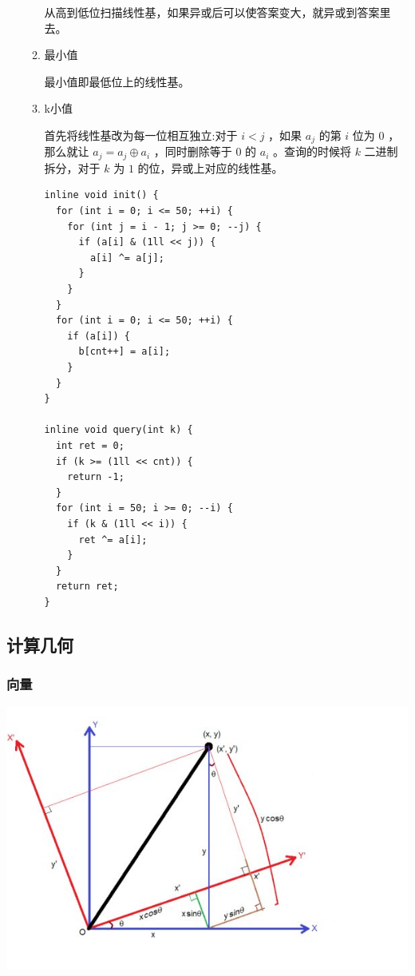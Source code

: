 \documentclass[11pt]{article}
\begin{document}
\begin{enumerate}
\begin{enumerate}
从高到低位扫描线性基，如果异或后可以使答案变大，就异或到答案里去。

\item 最小值
\label{sec-3-2-2-3-5}

最小值即最低位上的线性基。

\item k小值
\label{sec-3-2-2-3-6}

首先将线性基改为每一位相互独立:对于 $i < j$ ，如果 $a_j$ 的第 $i$ 位为 $0$ ，那么就让 $a_j=a_j \oplus a_i$ ，同时删除等于 $0$ 的 $a_i$ 。查询的时候将 $k$ 二进制拆分，对于 $k$ 为 $1$ 的位，异或上对应的线性基。

\begin{verbatim}
inline void init() {
  for (int i = 0; i <= 50; ++i) {
    for (int j = i - 1; j >= 0; --j) {
      if (a[i] & (1ll << j)) {
        a[i] ^= a[j];
      }
    }
  }
  for (int i = 0; i <= 50; ++i) {
    if (a[i]) {
      b[cnt++] = a[i];
    }
  }
}

inline void query(int k) {
  int ret = 0;
  if (k >= (1ll << cnt)) {
    return -1;
  }
  for (int i = 50; i >= 0; --i) {
    if (k & (1ll << i)) {
      ret ^= a[i];
    }
  }
  return ret;
}
\end{verbatim}
\end{enumerate}
\end{enumerate}
\subsection{计算几何}
\label{sec-3-3}
\subsubsection{向量}
\label{sec-3-3-1}

\includegraphics[width=.9\linewidth]{./Source/Picture/vector.png}
\end{document}
